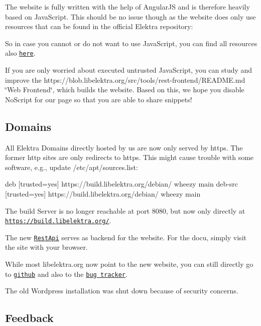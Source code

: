 The website is fully written with the help of Angular\+JS and is therefore heavily based on Java\+Script. This should be no issue though as the website does only use resources that can be found in the official Elektra repository\+:


\begin{DoxyEnumerate}
\item So in case you cannot or do not want to use Java\+Script, you can find all resources also \href{https://git.libelektra.org}{\tt here}.
\item If you are only worried about executed untrusted Java\+Script, you can study and improve the https\+://blob.libelektra.\+org/src/tools/rest-\/frontend/\+R\+E\+A\+D\+ME.md \char`\"{}\+Web Frontend\char`\"{}, which builds the website. Based on this, we hope you disable {\ttfamily No\+Script} for our page so that you are able to share snippets!
\end{DoxyEnumerate}

\subsection*{Domains}

All Elektra Domains directly hosted by us are now only served by {\ttfamily https}. The former {\ttfamily http} sites are only redirects to {\ttfamily https}. This might cause trouble with some software, e.\+g., update {\ttfamily /etc/apt/sources.list}\+:


\begin{DoxyCode}
deb     [trusted=yes] https://build.libelektra.org/debian/ wheezy main
deb-src [trusted=yes] https://build.libelektra.org/debian/ wheezy main
\end{DoxyCode}


The build Server is no longer reachable at port 8080, but now only directly at \href{https://build.libelektra.org/}{\tt https\+://build.\+libelektra.\+org/}.

The new \href{https://restapi.libelektra.org}{\tt Rest\+Api} serves as backend for the website. For the docu, simply visit the site with your browser.

While most {\ttfamily libelektra.\+org} now point to the new website, you can still directly go to \href{https://git.libelektra.org}{\tt github} and also to the \href{https://bugs.libelektra.org}{\tt bug tracker}.

The old Wordpress installation was shut down because of security concerns.

\subsection*{Feedback}

